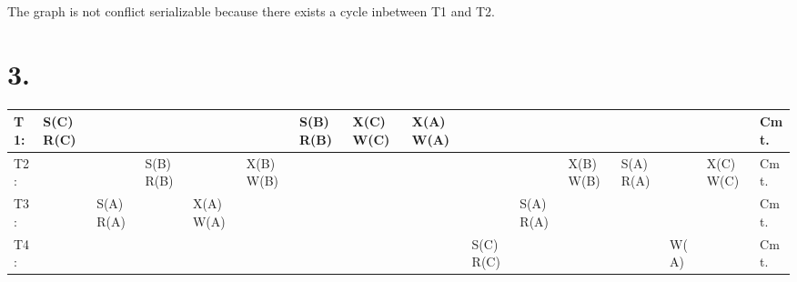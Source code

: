 \documentclass{article}
\begin{document}
The graph is not conflict serializable because there exists a cycle inbetween T1 and T2.

\chapter{3.}

{\small %
\begin{tabular}{|l||lllllllllllllll|}
\hline
T1:&S(C)R(C)& & & & &S(B)R(B)&X(C)W(C) &X(A)W(A)& & & & &&&Cmt.\\ \hline
T2:&& &S(B)R(B)& &X(B)W(B)& & & & & &X(B)W(B) &S(A)R(A)& &X(C)W(C)&Cmt.\\ \hline
T3:&&S(A)R(A)& &X(A)W(A) & & & & && S(A)R(A)& & & &&Cmt.\\ \hline
T4:&& & & & & & & & S(C)R(C)& && &W(A) &&Cmt.\\ \hline
\end{tabular}
}
\end{document}

